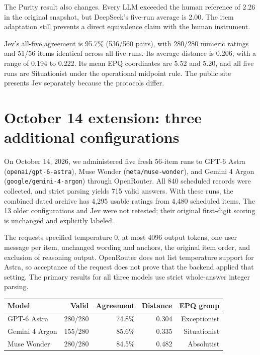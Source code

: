 \documentclass[11pt]{article}
\begin{document}
The Purity result also changes. Every LLM exceeded the human reference of 2.26 in the original snapshot, but DeepSeek's five-run average is 2.00. The item adaptation still prevents a direct equivalence claim with the human instrument.

Jev's all-five agreement is 95.7\% (536/560 pairs), with 280/280 numeric ratings and 51/56 items identical across all five runs. Its average distance is 0.206, with a range of 0.194 to 0.222. Its mean EPQ coordinates are 5.52 and 5.20, and all five runs are Situationist under the operational midpoint rule. The public site presents Jev separately because the protocols differ.

\section{October 14 extension: three additional configurations}

On October 14, 2026, we administered five fresh 56-item runs to GPT-6 Astra (\texttt{openai/gpt-6-astra}), Muse Wonder (\texttt{meta/muse-wonder}), and Gemini 4 Argon (\texttt{google/gemini-4-argon}) through OpenRouter. All 840 scheduled records were collected, and strict parsing yields 715 valid answers. With these runs, the combined dated archive has 4,295 usable ratings from 4,480 scheduled items. The 13 older configurations and Jev were not retested; their original first-digit scoring is unchanged and explicitly labeled.

The requests specified temperature 0, at most 4096 output tokens, one user message per item, unchanged wording and anchors, the original item order, and exclusion of reasoning output. OpenRouter does not list temperature support for Astra, so acceptance of the request does not prove that the backend applied that setting. The primary results for all three models use strict whole-answer integer parsing.

\begin{center}\begin{tabular}{lrrrr}\toprule
Model & Valid & Agreement & Distance & EPQ group\\\midrule
GPT-6 Astra & 280/280 & 74.8\% & 0.304 & Exceptionist\\
Gemini 4 Argon & 155/280 & 85.6\% & 0.335 & Situationist\\
Muse Wonder & 280/280 & 84.5\% & 0.482 & Absolutist\\
\bottomrule\end{tabular}\end{center}
\end{document}
